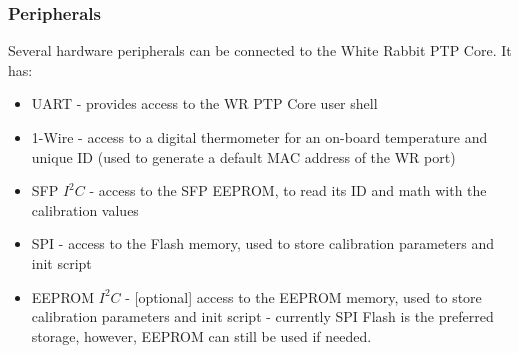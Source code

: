 \subsubsection{Peripherals}
\label{sec:wrpc_periph}

Several hardware peripherals can be connected to the White Rabbit PTP Core. It
has:
\begin{itemize}
  \item UART - provides access to the WR PTP Core user shell
  \item 1-Wire - access to a digital thermometer for an on-board temperature and
    unique ID (used to generate a default MAC address of the WR port)
  \item SFP $I^2C$ - access to the SFP EEPROM, to read its ID and math with the
    calibration values
  \item SPI - access to the Flash memory, used to store calibration
    parameters and init script
  \item EEPROM $I^2C$ - [optional] access to the EEPROM memory, used to store
    calibration parameters and init script - currently SPI Flash is the
    preferred storage, however, EEPROM can still be used if needed.
\end{itemize}
